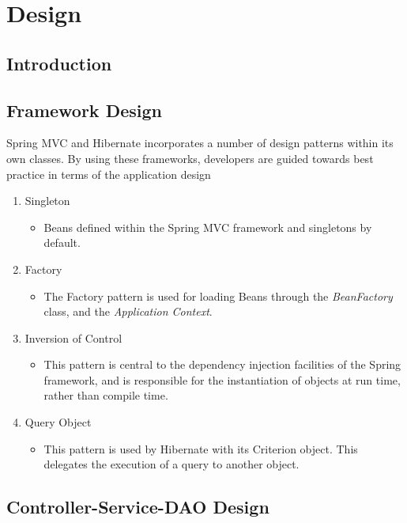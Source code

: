 \chapter{Design}
\label{design}

\section{Introduction}

\section{Framework Design}

Spring MVC and Hibernate incorporates a number of design patterns within its own classes. By using these frameworks, developers are guided towards best practice in terms of the application design

\begin{table}[H]
\begin{enumerate}
\item Singleton
\begin{itemize}
\item Beans defined within the Spring MVC framework and singletons by default. 
\end{itemize}
\item Factory
\begin{itemize}
\item The Factory pattern is used for loading Beans through the \textit{BeanFactory} class, and the \textit{Application Context}. 
\end{itemize}
\item Inversion of Control
\begin{itemize}
\item This pattern is central to the dependency injection facilities of the Spring framework, and is responsible for the instantiation of objects at run time, rather than compile time.
\end{itemize}
\item Query Object
\begin{itemize}
\item This pattern is used by Hibernate with its Criterion object. This delegates the execution of a query to another object. 
\end{itemize}
\end{enumerate}
\label{fig:springdesignpatterns}
\end{table}

\label{sec:design}
\section{Controller-Service-DAO Design}

